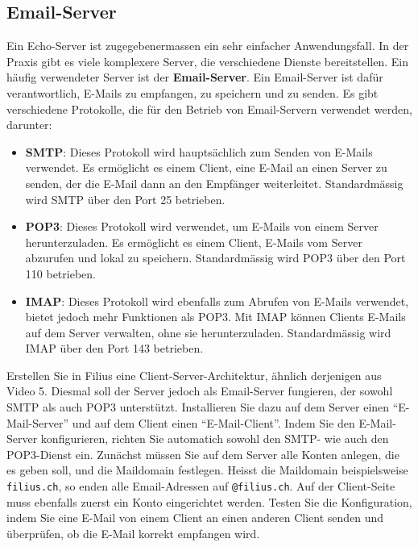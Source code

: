 \subsection{Email-Server}
Ein Echo-Server ist zugegebenermassen ein sehr einfacher Anwendungsfall. In der Praxis gibt es viele komplexere Server, die verschiedene Dienste bereitstellen. Ein häufig verwendeter Server ist der \textbf{Email-Server}. Ein Email-Server ist dafür verantwortlich, E-Mails zu empfangen, zu speichern und zu senden. Es gibt verschiedene Protokolle, die für den Betrieb von Email-Servern verwendet werden, darunter:
\begin{itemize}
	\item \textbf{\acrfull{SMTP}}: Dieses Protokoll wird hauptsächlich zum Senden von E-Mails verwendet. Es ermöglicht es einem Client, eine E-Mail an einen Server zu senden, der die E-Mail dann an den Empfänger weiterleitet. Standardmässig wird \gls{SMTP} über den Port 25 betrieben.
	\item \textbf{\acrfull{POP3}}: Dieses Protokoll wird verwendet, um E-Mails von einem Server herunterzuladen. Es ermöglicht es einem Client, E-Mails vom Server abzurufen und lokal zu speichern. Standardmässig wird \gls{POP3} über den Port 110 betrieben.
	\item \textbf{\acrfull{IMAP}}: Dieses Protokoll wird ebenfalls zum Abrufen von E-Mails verwendet, bietet jedoch mehr Funktionen als \gls{POP3}. Mit \gls{IMAP} können Clients E-Mails auf dem Server verwalten, ohne sie herunterzuladen. Standardmässig wird \gls{IMAP} über den Port 143 betrieben.
\end{itemize}

\begin{mychallenge}
	Erstellen Sie in Filius eine Client-Server-Architektur, ähnlich derjenigen aus Video 5. Diesmal soll der Server jedoch als Email-Server fungieren, der sowohl \gls{SMTP} als auch \gls{POP3} unterstützt. Installieren Sie dazu auf dem Server einen \enquote{E-Mail-Server} und auf dem Client einen \enquote{E-Mail-Client}. Indem Sie den E-Mail-Server konfigurieren, richten Sie automatich sowohl den \gls{SMTP}- wie auch den \gls{POP3}-Dienst ein.
	Zunächst müssen Sie auf dem Server alle Konten anlegen, die es geben soll, und die Maildomain festlegen. Heisst die Maildomain beispielsweise \texttt{filius.ch}, so enden alle Email-Adressen auf \texttt{@filius.ch}. Auf der Client-Seite muss ebenfalls zuerst ein Konto eingerichtet werden. Testen Sie die Konfiguration, indem Sie eine E-Mail von einem Client an einen anderen Client senden und überprüfen, ob die E-Mail korrekt empfangen wird.
\end{mychallenge}

